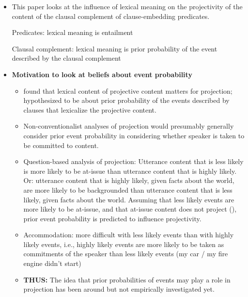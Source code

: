 \documentclass[11pt,fleqn]{article}
\newcommand{\6}{\mbox{$[\hspace*{-.6mm}[$}}
\newcommand{\9}{\mbox{$]\hspace*{-.6mm}]$}}
\begin{document}
\begin{itemize}

\item This paper looks at the influence of lexical meaning on the projectivity of the content of the clausal complement of clause-embedding predicates.

Predicates: lexical meaning is entailment

Clausal complement: lexical meaning is prior probability of the event described by the clausal complement

\item {\bf Motivation to look at beliefs about event probability}

\begin{itemize}

\item \citealt*{tbd-variability} found that lexical content of projective content matters for projection; hypothesized to be about prior probability of the events described by clauses that lexicalize the projective content.

\item Non-conventionalist analyses of projection would presumably generally consider prior event probability in considering whether speaker is taken to be committed to content.

\item Question-based analysis of projection: Utterance content that is less likely is more likely to be at-issue than utterance content that is highly likely. Or: utterance content that is highly likely, given facts about the world, are more likely to be backgrounded than utterance content that is less likely, given facts about the world. Assuming that less likely events are more likely to be at-issue, and that at-issue content does not project (\citealt{brst-salt10,tbd-variability}), prior event probability is predicted to influence projectivity.

\item Accommodation: more difficult with less likely events than with highly likely events, i.e., highly likely events are more likely to be taken as commitments of the speaker than less likely events (my car / my fire engine didn't start)

\item {\bf THUS:} The idea that prior probabilities of events may play a role in projection has been around but not empirically investigated yet.

\end{itemize}


\end{itemize}
\end{document}
